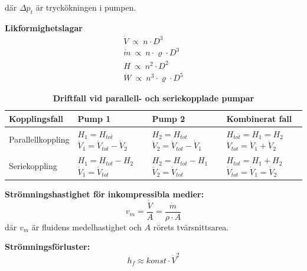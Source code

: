        där $ \Delta p_t $  är tryckökningen i pumpen. \par
	\textbf{Likformighetslagar } 
	\begin{align*} 
  & \dot{V} \: \propto \: n \cdot D^3 & \\ 
	& \dot{m} \: \propto \: n \cdot \varrho \cdot  D^3 \\ 
  & H \: \propto \: n^2 \cdot D^2  \\
  & \dot{W} \: \propto \: n^3 \cdot \varrho \cdot D^5  
	\end{align*}
	\begin{table}[ht]
    \caption*{\textbf{Driftfall vid parallell- och seriekopplade pumpar}}
    \centering
    \begin{tabularx}{\linewidth}{X p{3cm} p{3cm} p{3cm}}
        \hline
        Kopplingsfall & Pump 1 & Pump 2 & Kombinerat fall \\
        \hline
        Parallellkoppling 
        							& $H_1 = H_{tot}$ \newline $\dot{V}_1=\dot{V}_{tot} - \dot{V}_{2}$  
        							& $H_2 = H_{tot}$ \newline $\dot{V}_2=\dot{V}_{tot} - \dot{V}_{1}$
        							& $H_{tot}=H_1 = H_2$\newline $\dot{V}_{tot}=\dot{V}_{1}+\dot{V}_{2}$\\
        Seriekoppling 
        							& $H_1=H_{tot} - H_{2}$ \newline $\dot{V}_1 = \dot{V}_{tot}$ 
        							& $H_2=H_{tot} - H_{1}$ \newline $\dot{V}_2 = \dot{V}_{tot}$ 
        							& $H_{tot}=H_1 + H_2$\newline $\dot{V}_{tot}=\dot{V}_{1}=\dot{V}_{2}$\\
        \hline
    \end{tabularx}
\end{table}
\par
	\textbf{Strömningshastighet för inkompressibla medier: } 
	\begin{equation*}
    v_m = \dfrac{\dot{V}}{A} =  \dfrac{\dot{m}}{\rho \cdot A}
	\end{equation*}
		där $v_m$ är fluidens medelhastighet och $A$ rörets tvärsnittsarea.\par 
\par
	\textbf{Strömningsförluster: } 
	\begin{equation*}
		h_f \approx konst \cdot \dot{V}^2
	\end{equation*}

